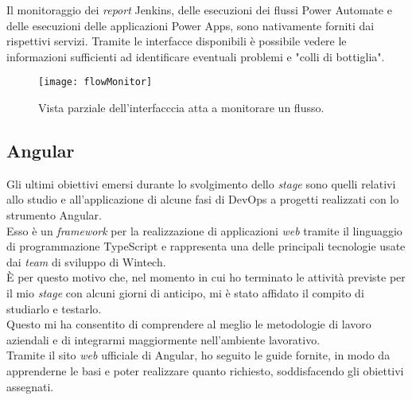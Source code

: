 Il monitoraggio dei \emph{report} Jenkins, delle esecuzioni dei flussi Power Automate e delle esecuzioni delle applicazioni Power Apps, sono nativamente forniti dai rispettivi servizi.
Tramite le interfacce disponibili è possibile vedere le informazioni sufficienti ad identificare eventuali problemi e "colli di bottiglia".
\begin{figure}[htbp] 
    \centering 
    \texttt{[image: flowMonitor]} 
    \caption{Vista parziale dell'interfacccia atta a monitorare un flusso.}
    \label{fig:flowMonitor}
\end{figure}


\subsection{Angular}
Gli ultimi obiettivi emersi durante lo svolgimento dello \emph{stage} sono quelli relativi allo studio e all'applicazione di alcune fasi di \gls{DevOps} a progetti realizzati con lo strumento Angular.\\
Esso è un \emph{framework} per la realizzazione di applicazioni \emph{web} tramite il linguaggio di programmazione TypeScript e rappresenta una delle principali tecnologie usate dai \emph{team} di sviluppo di Wintech.\\
È per questo motivo che, nel momento in cui ho terminato le attività previste per il mio \emph{stage} con alcuni giorni di anticipo, mi è stato affidato il compito di studiarlo e testarlo.\\
Questo mi ha consentito di comprendere al meglio le metodologie di lavoro aziendali e di integrarmi maggiormente nell'ambiente lavorativo.\\
Tramite il sito \emph{web} ufficiale di Angular, ho seguito le guide fornite, in modo da apprenderne le basi e poter realizzare quanto richiesto, soddisfacendo gli obiettivi assegnati.\\

